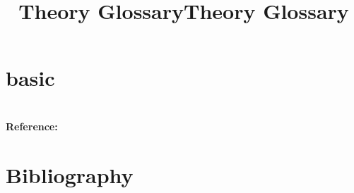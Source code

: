 \documentclass{amsart}
\begin{document}
	\title{Theory Glossary}
	\maketitle

	\tableofcontents
	\title{Theory Glossary}

	\section{basic}
	\paragraph{\\ Reference:} \cite{nla.cat-vn6450419}


  \section{Bibliography}
{}

\end{document}
